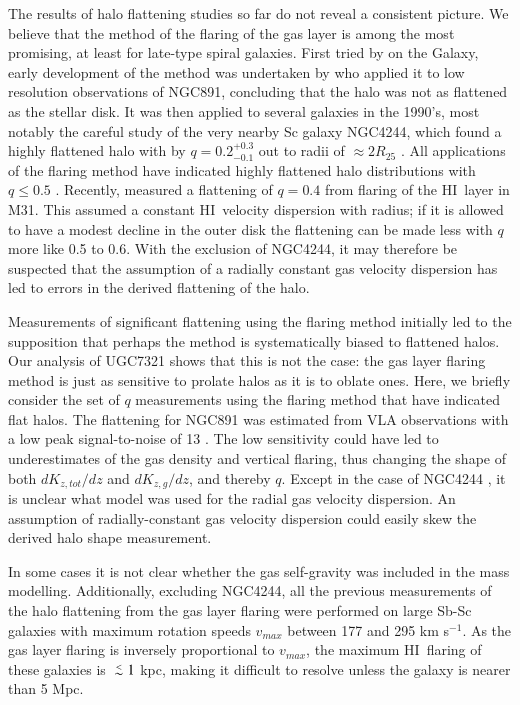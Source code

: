 \documentclass[traditabstract]{aa} %
\newcommand\lesim{\lower.5ex\hbox{$\; \buildrel < \over \sim \;$}}
\newcommand\HI{H{\small I}}
\newcommand\kms{km s$^{-1}$}
\begin{document}
The results of halo flattening studies so far do not reveal a
consistent picture.  We believe that the method of the flaring of
the gas layer is among the most promising, at least for late-type
spiral galaxies.   First tried by \citet{crb1979} on the Galaxy,
early development of the method was undertaken by \citet{vdkruit1981}
who applied it to low resolution observations of NGC891, concluding
that the halo was not as flattened as the stellar disk. It was then
applied to several galaxies in the 1990's, most notably the careful
study of the very nearby Sc galaxy NGC4244, which found a highly
flattened halo with by $q=0.2^{+0.3}_{-0.1}$ out to radii of $\approx
2 R_{25}$ \citep{olling1996b}. All applications of the flaring
method have indicated  highly flattened halo distributions with $q
\leq 0.5$ \citep{becquaert1997,bc1997a,sicking1997}.  Recently,
\citet{bj2008} measured a flattening of $q=0.4$ from flaring of the
\HI\ layer in M31. This assumed a constant \HI\ velocity dispersion
with radius; if it is allowed to have a modest decline in the outer
disk the flattening can be made less with $q$ more like 0.5 to 0.6.
With the exclusion of NGC4244, it may therefore be suspected that
the assumption of a radially constant gas velocity dispersion has led
to errors in the derived flattening of the halo.

Measurements of significant flattening using the flaring method
initially led to the supposition that perhaps the method is
systematically biased to flattened halos. Our analysis of UGC7321
shows that this is not the case: the gas layer flaring method is
just as sensitive to prolate halos as it is to oblate ones. Here,
we briefly consider the set of $q$ measurements using the flaring
method that have indicated flat halos. The flattening for NGC891 
\citep{bc1997a} was estimated from 
VLA observations with a low peak signal-to-noise of 13
\citep{rupen1991}. The low sensitivity could have led to underestimates
of the gas density and vertical flaring, thus changing the shape of
both $dK_{z,tot}/dz$ and $dK_{z,g}/dz$, and thereby $q$. Except in
the case of NGC4244 \citep{olling1996b}, it is unclear what model
was used for the radial gas velocity dispersion. An assumption of
radially-constant gas velocity dispersion could easily skew the
derived halo shape measurement.

In some cases it is
not clear whether the gas self-gravity was included in the mass modelling.
Additionally, excluding NGC4244, all the previous measurements of the
halo flattening from the gas layer flaring were performed on large Sb-Sc
galaxies with maximum rotation speeds $v_{max}$ between 177 and
295 \kms. As the gas layer flaring is inversely proportional to
$v_{max}$, the maximum \HI\ flaring of these galaxies is $\lesim 1$
kpc, making it difficult to resolve unless the galaxy is
nearer than 5 Mpc.
\end{document}
